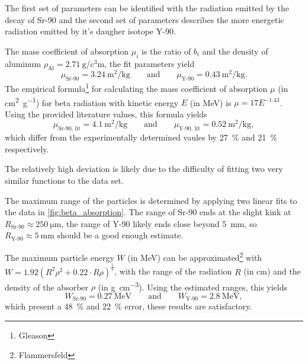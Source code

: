 The first set of parameters can be identified with the radiation emitted by the decay of Sr-90 and the second set of parameters describes the more energetic radiation emitted by it's daugher isotope Y-90.

The mass coefficient of absorption $\mu_i$ is the ratio of $b_i$ and the density of aluminum $\rho_\text{Al} = \SI{2.71}{\gram\per\cubic\centi\meter}$, the fit parameters yield
\begin{equation*}
	\mu_\text{Sr-90} = \SI{3.24}{\meter\squared\per\kilo\gram} \qquad \text{and} \qquad \mu_\text{Y-90} = \SI{0.43}{\meter\squared\per\kilo\gram}.
\end{equation*}
The empirical formula\footnote{Gleason} for calculating the mass coefficient of absorption $\mu$ (in \si{\centi\meter\squared\per\gram}) for beta radiation with kinetic energy $E$ (in \si{\MeV}) is $\mu = 17 E^{-1.43}$.
Using the provided literature values, this formula yields
\begin{equation*}
	\mu_\text{Sr-90, lit} = \SI{4.1}{\meter\squared\per\kilo\gram} \qquad \text{and} \qquad \mu_\text{Y-90, lit} = \SI{0.52}{\meter\squared\per\kilo\gram},
\end{equation*}
which differ from the experimentally determined vaules by \SI{27}{\percent} and \SI{21}{\percent} respectively.

The relatively high deviation is likely due to the difficulty of fitting two very similar functions to the data set.

The maximum range of the particles is determined by applying two linear fits to the data in \autoref{fig:beta_absorption}.
The range of Sr-90 ends at the slight kink at $R_\text{Sr-90} \approx \SI{250}{\um}$, the range of Y-90 likely ends close beyond \SI{5}{\mm}, so $R_\text{Y-90} \approx \SI{5}{\mm}$ should be a good enough estimate.

The maximum particle energy $W$ (in \si{\MeV}) can be approximated\footnote{Flammersfeld} with $W = 1.92\left(R^2\rho^2 + 0.22 \cdot R\rho\right)^\frac{1}{2}$, with the range of the radiation $R$ (in \si{\cm}) and the density of the absorber $\rho$ (in \si{\gram\per\cm\cubed}).
Using the estimated ranges, this yields
\begin{equation*}
	W_\text{Sr-90} = \SI{0.27}{\MeV} \qquad \text{and} \qquad W_\text{Y-90} = \SI{2.8}{\MeV},
\end{equation*}
which present a \SI{48}{\percent} and \SI{22}{\percent} error, these results are satisfactory.
